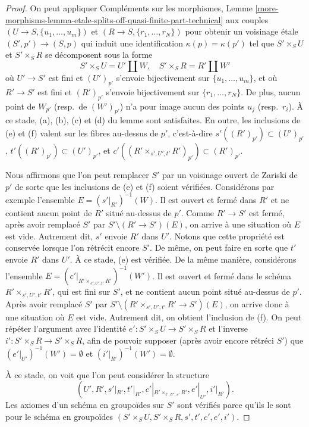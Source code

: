\begin{proof}
\medskip\noindent
On peut appliquer
Compléments sur les morphismes,
Lemme \ref{more-morphisms-lemma-etale-splits-off-quasi-finite-part-technical}
aux couples
$(U \to S, \{u_1, \ldots, u_m\})$ et
$(R \to S, \{r_1, \ldots, r_N\})$
pour obtenir un voisinage \'etale $(S', p') \to (S, p)$
qui induit une identification $\kappa(p) = \kappa(p')$
tel que $S' \times_S U$ et $S' \times_S R$ se décomposent sous la forme
$$
S' \times_S U = U' \amalg W, \quad
S' \times_S R = R' \amalg W'
$$
où $U' \to S'$ est fini et $(U')_{p'}$ s'envoie bijectivement sur
$\{u_1, \ldots, u_m\}$, et où $R' \to S'$ est fini et
$(R')_{p'}$ s'envoie bijectivement sur $\{r_1, \ldots, r_N\}$.
De plus, aucun point de $W_{p'}$ (resp.\ de $(W')_{p'}$) n'a pour image
aucun des points $u_j$ (resp.\ $r_i$). À ce stade, (a), (b), (c) et (d)
du lemme sont satisfaites. En outre, les inclusions de (e) et (f) valent
sur les fibres au-dessus de $p'$, c'est-à-dire $s'((R')_{p'}) \subset (U')_{p'}$,
$t'((R')_{p'}) \subset (U')_{p'}$, et
$c'((R' \times_{s', U', t'} R')_{p'}) \subset (R')_{p'}$.

\medskip\noindent
Nous affirmons que l'on peut remplacer $S'$ par un voisinage ouvert de Zariski
de $p'$ de sorte que les inclusions de (e) et (f) soient vérifiées.
Considérons par exemple l'ensemble $E = (s'|_{R'})^{-1}(W)$.
Il est ouvert et fermé dans $R'$ et ne contient aucun point
de $R'$ situé au-dessus de $p'$. Comme $R' \to S'$ est fermé,
après avoir remplacé $S'$ par $S' \setminus (R' \to S')(E)$, on arrive à une
situation où $E$ est vide. Autrement dit, $s'$ envoie $R'$ dans $U'$.
Notons que cette propriété est conservée lorsque l'on rétrécit encore $S'$.
De même, on peut faire en sorte que $t'$ envoie $R'$ dans $U'$.
À ce stade, (e) est vérifiée. De la même manière, considérons l'ensemble
$E = (c'|_{R' \times_{s', U', t'} R'})^{-1}(W')$.
Il est ouvert et fermé dans le schéma $R' \times_{s', U', t'} R'$,
qui est fini sur $S'$, et ne contient aucun point situé
au-dessus de $p'$. Après avoir remplacé $S'$ par
$S' \setminus (R' \times_{s', U', t'} R' \to S')(E)$,
on arrive donc à une situation où $E$ est vide. Autrement dit, on obtient
l'inclusion de (f). On peut répéter l'argument avec l'identité
$e' : S' \times_S U \to S' \times_S R$ et l'inverse
$i' : S' \times_S R \to S' \times_S R$, afin de pouvoir supposer
(après avoir encore rétréci $S'$) que $(e'|_{U'})^{-1}(W') = \emptyset$
et $(i'|_{R'})^{-1}(W') = \emptyset$.

\medskip\noindent
À ce stade, on voit que l'on peut considérer la structure
$$
(U', R', s'|_{R'}, t'|_{R'}, c'|_{R' \times_{t', U', s'} R'},
e'|_{U'}, i'|_{R'}).
$$
Les axiomes d'un schéma en groupoïdes sur $S'$ sont vérifiés
parce qu'ils le sont pour le schéma en groupoïdes
$(S' \times_S U, S' \times_S R, s', t', c', e', i')$.
\end{proof}


